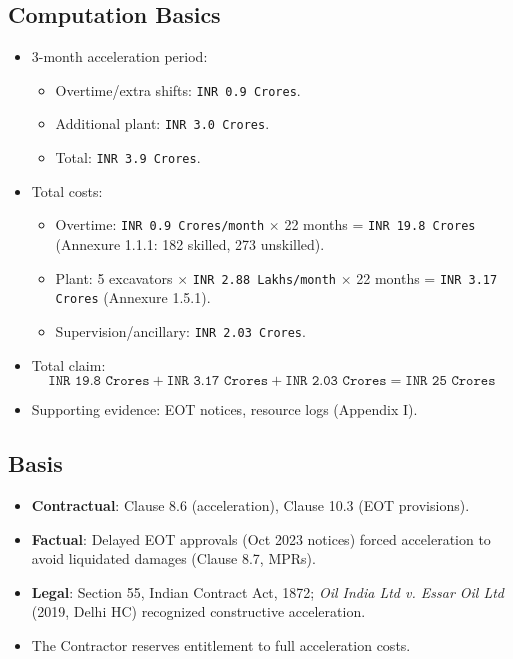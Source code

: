 \documentclass[12pt,letterpaper]{article}
\begin{document}
	\subsection*{Computation Basics}
	\begin{itemize}
		\item 3-month acceleration period:
		\begin{itemize}
			\item Overtime/extra shifts: \texttt{INR 0.9 Crores}.
			\item Additional plant: \texttt{INR 3.0 Crores}.
			\item Total: \texttt{INR 3.9 Crores}.
		\end{itemize}
		\item Total costs:
		\begin{itemize}
			\item Overtime: \texttt{INR 0.9 Crores/month} $\times$ 22 months = \texttt{INR 19.8 Crores} (Annexure 1.1.1: 182 skilled, 273 unskilled).
			\item Plant: 5 excavators $\times$ \texttt{INR 2.88 Lakhs/month} $\times$ 22 months = \texttt{INR 3.17 Crores} (Annexure 1.5.1).
			\item Supervision/ancillary: \texttt{INR 2.03 Crores}.
		\end{itemize}
		\item Total claim:
		\[
		\texttt{INR 19.8 Crores} + \texttt{INR 3.17 Crores} + \texttt{INR 2.03 Crores} = \texttt{INR 25 Crores}
		\]
		\item Supporting evidence: EOT notices, resource logs (Appendix I).
	\end{itemize}
	
	\subsection*{Basis}
	\begin{itemize}
		\item \textbf{Contractual}: Clause 8.6 (acceleration), Clause 10.3 (EOT provisions).
		\item \textbf{Factual}: Delayed EOT approvals (Oct 2023 notices) forced acceleration to avoid liquidated damages (Clause 8.7, MPRs).
		\item \textbf{Legal}: Section 55, Indian Contract Act, 1872; \textit{Oil India Ltd v. Essar Oil Ltd} (2019, Delhi HC) recognized constructive acceleration.
		\item The Contractor reserves entitlement to full acceleration costs.
	\end{itemize}
	
\end{document}
